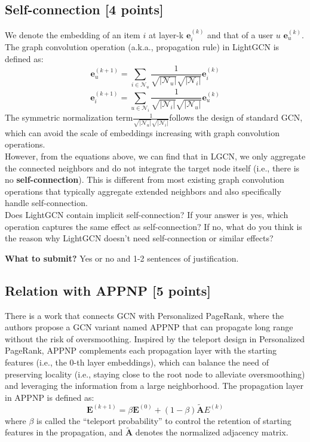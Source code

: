 \subsection{Self-connection [4 points]}
We denote the embedding of an item $i$ at layer-k $\mathbf{e}_i^{(k)}$ and that of a user $u$ $\mathbf{e}_u^{(k)}$. The graph convolution operation (a.k.a., propagation rule) in LightGCN is defined as:
$$\mathbf{e}^{(k+1)}_u = \sum_{i\in\mathcal{N}_u}\frac{1}{\sqrt{\lvert\mathcal{N}_u\rvert}\sqrt{\lvert\mathcal{N}_i\rvert}}\mathbf{e}^{(k)}_i$$
$$\mathbf{e}^{(k+1)}_i = \sum_{u\in\mathcal{N}_i}\frac{1}{\sqrt{\lvert\mathcal{N}_i\rvert}\sqrt{\lvert\mathcal{N}_u\rvert}}\mathbf{e}^{(k)}_u$$  
The symmetric normalization term$\frac{1}{\sqrt{\lvert\mathcal{N}_u\rvert}\sqrt{\lvert\mathcal{N}_i\rvert}}$follows the design of standard GCN, which can avoid the scale of embeddings increasing with graph convolution operations.\\ 

\noindent However, from the equations above, we can find that in LGCN, we only aggregate the connected neighbors and do not integrate the target node itself (i.e., there is no \textbf{self-connection}). This is different from most existing graph convolution operations that typically aggregate extended neighbors and also specifically handle self-connection.\\

\noindent Does LightGCN contain implicit self-connection? If your answer is yes, which operation captures the same effect as self-connection? If no, what do you think is the reason why LightGCN doesn't need self-connection or similar effects?

\textbf{What to submit?} Yes or no and 1-2 sentences of justification.

\Solution{}

\subsection{Relation with APPNP [5 points]}
There is a work that connects GCN with Personalized PageRank, where the authors propose a GCN variant named APPNP that can propagate long range without the risk of oversmoothing. Inspired by the teleport design in Personalized PageRank, APPNP complements each propagation layer with the starting features (i.e., the 0-th layer embeddings), which can balance the need of preserving locality (i.e., staying close to the root node to alleviate oversmoothing) and leveraging the information from a large neighborhood. The propagation layer in APPNP is defined as:
$$\mathbf{E}^{(k+1)} = \beta\mathbf{E}^{(0)}+(1-\beta)\tilde{\mathbf{A}}E^{(k)}$$
where $\beta$ is called the ``teleport probability'' to control the retention of starting features in the propagation, and $\tilde{\mathbf{A}}$ denotes the normalized adjacency matrix.\\

